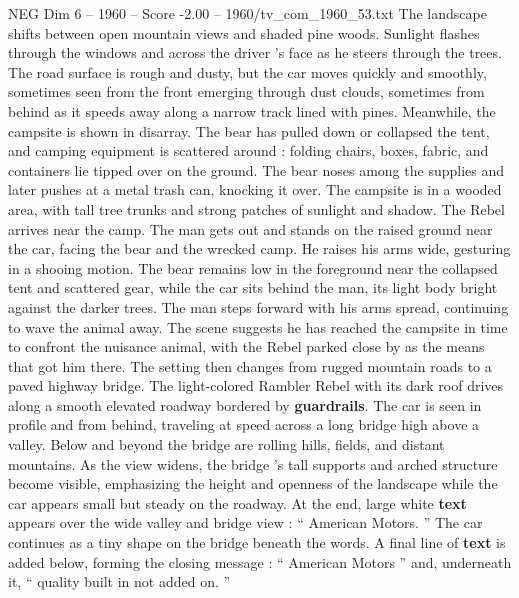 \begin{textsample}{NEG Dim 6 – 1960 – Score -2.00 – 1960/tv\_com\_1960\_53.txt}
The landscape shifts between open mountain views and shaded pine woods.
Sunlight flashes through the windows and across the driver ’s face as he steers through the trees.
The road surface is rough and dusty, but the car moves quickly and smoothly, sometimes seen from the front emerging through dust clouds, sometimes from behind as it speeds away along a narrow track lined with pines.
Meanwhile, the campsite is shown in disarray.
The bear has pulled down or collapsed the tent, and camping equipment is scattered around : folding chairs, boxes, fabric, and containers lie tipped over on the ground.
The bear noses among the supplies and later pushes at a metal trash can, knocking it over.
The campsite is in a wooded area, with tall tree trunks and strong patches of sunlight and shadow.
The Rebel arrives near the camp.
The man gets out and stands on the raised ground near the car, facing the bear and the wrecked camp.
He raises his arms wide, gesturing in a shooing motion.
The bear remains low in the foreground near the collapsed tent and scattered gear, while the car sits behind the man, its light body bright against the darker trees.
The man steps forward with his arms spread, continuing to wave the animal away.
The scene suggests he has reached the campsite in time to confront the nuisance animal, with the Rebel parked close by as the means that got him there.
The setting then changes from rugged mountain roads to a paved highway bridge.
The light-colored Rambler Rebel with its dark roof drives along a smooth elevated roadway bordered by \textbf{guardrails}.
The car is seen in profile and from behind, traveling at speed across a long bridge high above a valley.
Below and beyond the bridge are rolling hills, fields, and distant mountains.
As the view widens, the bridge ’s tall supports and arched structure become visible, emphasizing the height and openness of the landscape while the car appears small but steady on the roadway.
At the end, large white \textbf{text} appears over the wide valley and bridge view : “ American Motors. ” The car continues as a tiny shape on the bridge beneath the words.
A final line of \textbf{text} is added below, forming the closing message : “ American Motors ” and, underneath it, “ quality built in not added on. ”

\end{textsample}
